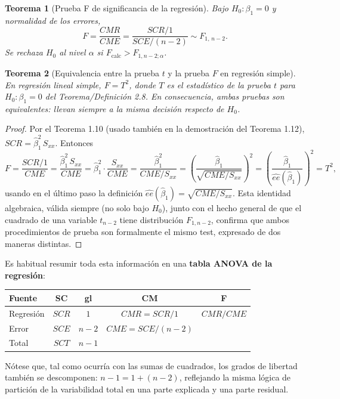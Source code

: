 \documentclass[11pt,a4paper]{article}
\theoremstyle{plain}
\newtheorem{teorema}{Teorema}[section]
\theoremstyle{definition}
\theoremstyle{remark}
\begin{document}
\begin{teorema}[Prueba F de significancia de la regresión]
Bajo $H_0:\beta_1=0$ y normalidad de los errores,
\[
F = \frac{CMR}{CME} = \frac{SCR/1}{SCE/(n-2)} \sim F_{1,\,n-2}.
\]
Se rechaza $H_0$ al nivel $\alpha$ si $F_{\text{calc}}>F_{1,n-2;\alpha}$.
\end{teorema}

\begin{teorema}[Equivalencia entre la prueba $t$ y la prueba $F$ en regresión simple]
En regresión lineal simple, $F=T^2$, donde $T$ es el estadístico de la prueba $t$ para $H_0:\beta_1=0$ del Teorema/Definición 2.8. En consecuencia, ambas pruebas son equivalentes: llevan siempre a la misma decisión respecto de $H_0$.
\end{teorema}

\begin{proof}
Por el Teorema 1.10 (usado también en la demostración del Teorema 1.12), $SCR=\hat\beta_1^2\,S_{xx}$. Entonces
\[
F = \frac{SCR/1}{CME} = \frac{\hat\beta_1^2\,S_{xx}}{CME} = \hat\beta_1^2\cdot\frac{S_{xx}}{CME} = \frac{\hat\beta_1^2}{CME/S_{xx}} = \left(\frac{\hat\beta_1}{\sqrt{CME/S_{xx}}}\right)^2 = \left(\frac{\hat\beta_1}{\widehat{ee}(\hat\beta_1)}\right)^2 = T^2,
\]
usando en el último paso la definición $\widehat{ee}(\hat\beta_1)=\sqrt{CME/S_{xx}}$. Esta identidad algebraica, válida siempre (no solo bajo $H_0$), junto con el hecho general de que el cuadrado de una variable $t_{n-2}$ tiene distribución $F_{1,n-2}$, confirma que ambos procedimientos de prueba son formalmente el mismo test, expresado de dos maneras distintas.
\end{proof}

Es habitual resumir toda esta información en una \textbf{tabla ANOVA de la regresión}:

\begin{center}
\begin{tabular}{lcccc}
\toprule
Fuente & SC & gl & CM & F \\
\midrule
Regresión & $SCR$ & $1$ & $CMR=SCR/1$ & $CMR/CME$ \\
Error & $SCE$ & $n-2$ & $CME=SCE/(n-2)$ & \\
\midrule
Total & $SCT$ & $n-1$ & & \\
\bottomrule
\end{tabular}
\end{center}

Nótese que, tal como ocurría con las sumas de cuadrados, los grados de libertad también se descomponen: $n-1=1+(n-2)$, reflejando la misma lógica de partición de la variabilidad total en una parte explicada y una parte residual.
\end{document}
